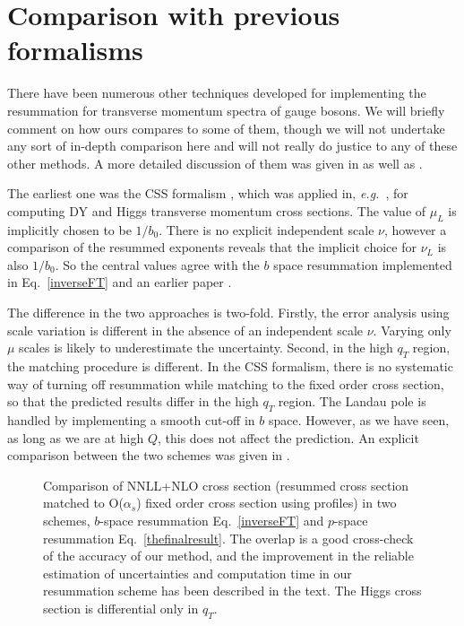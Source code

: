 \documentclass[a4,letterpaper,11pt]{article}
\newcommand{\eg}{\emph{e.g.}~}
\newcommand{\eq}[1]{Eq.~\eqref{#1}}
\begin{document}
\section{Comparison with previous formalisms}
\label{sec:compare}

There have been numerous other techniques developed for implementing the resummation for transverse momentum spectra of gauge bosons. We will briefly comment on how ours compares to some of them, though we will not undertake any sort of in-depth comparison here and will not really do justice to any of these other methods. A more detailed discussion of them was given in \cite{Neill:2015roa} as well as \cite{Ebert:2016gcn}.

The earliest one was the CSS formalism  \cite{Collins:1984kg,Collins:2011zzd}, which was applied in, \eg \cite{Bozzi:2010xn,deFlorian:2011xf},  for computing DY and Higgs transverse momentum cross sections. The value of $\mu_L$ is implicitly chosen to be $1/b_0$. There is no explicit independent scale $\nu$, however a comparison of the resummed exponents reveals that the implicit choice for $\nu_L$ is also $1/b_0$. So the central values agree with the $b$ space resummation implemented in \eq{inverseFT} and an earlier paper \cite{Neill:2015roa}.

The difference in the two approaches is two-fold. Firstly, the error analysis using scale variation is different in the absence of an independent scale $\nu$. Varying only $\mu$ scales is likely to underestimate the uncertainty.  Second, in the high $q_T$ region, the matching procedure is different. In the CSS formalism, there is no systematic way of turning off resummation  while matching to the fixed order cross section, so that the predicted results differ in the high $q_T$ region. The Landau pole is handled by implementing a smooth cut-off in $b$ space. However, as we have seen, as long as we are at high $Q$, this does not affect the prediction. An explicit comparison between the two schemes was given in \cite{Neill:2015roa}.

\begin{figure}
\centerline{}
\vskip-0.2cm
\caption[1]{Comparison of NNLL+NLO cross section (resummed cross section matched to O($\alpha_s$) fixed order cross section using profiles) in two schemes, $b$-space resummation \eq{inverseFT} and $p$-space resummation \eq{thefinalresult}. The overlap is a good cross-check of the accuracy of our method, and the improvement in the reliable estimation of uncertainties and computation time in our resummation scheme has been described in the text. The Higgs cross section is differential only in $q_T$.}
\label{fig:nnll} 
\end{figure}
\end{document}
